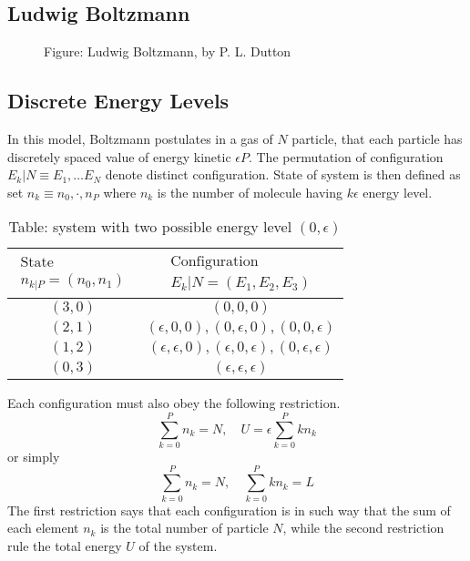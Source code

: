 \documentclass[../../../Main.tex]{subfiles}
\begin{document}
\subsection*{Ludwig Boltzmann}
\begin{figure*}[h]
    \centering
    \caption*{Figure: Ludwig Boltzmann, by P. L. Dutton}
\end{figure*}
\subsection*{Discrete Energy Levels}
In this model, Boltzmann postulates in a gas of $N$ particle, that each particle has discretely spaced value of energy kinetic $\epsilon P$. The permutation of configuration $E_k|N\equiv E_1,\dots E_N$ denote distinct configuration. State of system is then defined as set $n_k\equiv n_0,\cdot, n_P$ where $n_k$ is the number of molecule having $k\epsilon$ energy level.

\begin{table*}[ht]
    \begin{center}
\caption*{Table: system with two possible energy level $(0, \epsilon)$}
\begin{tabular}{c || c}
    \hline\hline
    $\begin{array}{c}\text{State} \\n_{k|P}=(n_0,n_1)\end{array}$  &  $\begin{array}{c}\text{Configuration} \\ E_k|N=(E_1 , E_2 , E_3 )\end{array}$ \\
    \hline\hline
    $(3, 0)$&$(0, 0, 0)$\\
    $(2, 1)$&$(\epsilon, 0, 0), (0, \epsilon, 0), (0, 0, \epsilon)$\\
    $(1, 2)$&$(\epsilon, \epsilon, 0), (\epsilon, 0, \epsilon), (0, \epsilon, \epsilon)$\\
    $(0, 3)$&$(\epsilon, \epsilon, \epsilon)$\\
\end{tabular}
    \end{center}
\end{table*}

Each configuration must also obey the following restriction.
\begin{equation*}
    \sum_{k=0}^{P}n_k=N,\quad U=\epsilon\sum_{k=0}^{P} kn_k
\end{equation*}
or simply
\begin{equation*}
    \sum_{k=0}^{P}n_k=N,\quad \sum_{k=0}^{P} kn_k=L
\end{equation*}
The first restriction says that each configuration is in such way that the sum of each element $n_k$ is the total number of particle $N$, while the second restriction rule the total energy $U$ of the system.
\end{document}
